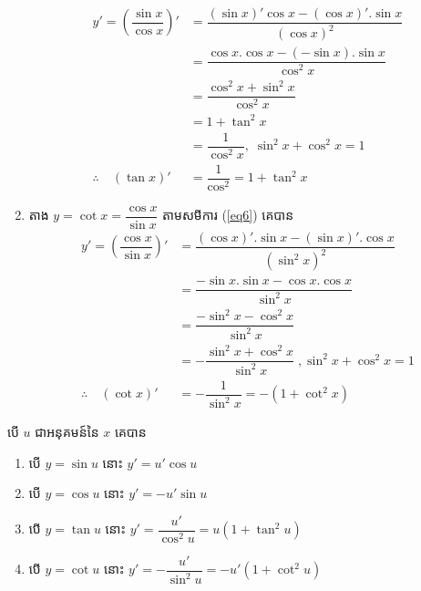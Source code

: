 \documentclass[a4paper,12pt]{article}
\begin{document}
\begin{enumerate}
	      \begin{align*}
		      y'=\left(\dfrac{\sin x}{\cos x} \right)' & =\dfrac{(\sin x)'\cos x-(\cos x)'.\sin x}{(\cos x)^2} \\
		                                               & =\dfrac{\cos x.\cos x-(-\sin x).\sin x}{\cos^2 x}     \\
		                                               & =\dfrac{\cos^2 x+\sin^2 x}{\cos^2 x}                  \\
		                                               & =1+\tan^2 x                                           \\
		                                               & =\dfrac{1}{\cos^2 x} ,\; \sin^2 x+\cos^2 x=1          \\
		      \therefore \quad (\tan x)'               & =\dfrac{1}{\cos^2}=1+\tan^2 x
	      \end{align*}
	\item តាង $y=\cot x=\dfrac{\cos x}{\sin x}$ តាមសមីការ (\ref{eq6}) គេបាន
	      \begin{align*}
		      y'=\left(\dfrac{\cos x}{\sin x} \right)' & =\dfrac{(\cos x)'.\sin x-(\sin x)'.\cos x}{(\sin^2x)^2}       \\
		                                               & =\dfrac{-\sin x. \sin x-\cos x.\cos x}{\sin^2 x}              \\
		                                               & =\dfrac{-\sin^2 x-\cos^2 x}{\sin^2 x}                         \\
		                                               & =-\dfrac{\sin^2 x+\cos^2 x}{\sin^2 x} \;, \sin^2 x+\cos^2 x=1 \\
		      \therefore \quad (\cot x)'               & =-\dfrac{1}{\sin^2 x}=-(1+\cot^2x)
	      \end{align*}
\end{enumerate}
\begin{general}
	បើ $u$ ជាអនុគមន៍នៃ $x$ គេបាន
	\begin{enumerate}
		\item បើ $y=\sin u$ នោះ $y'=u'\cos u$
		\item បើ $y=\cos u$ នោះ $y'=-u'\sin u$
		\item បើ $y=\tan u$ នោះ $y'=\dfrac{u'}{\cos^2 u}=u(1+\tan^2 u)$
		\item បើ $y=\cot u$ នោះ $y'=-\dfrac{u'}{\sin^2 u}=-u'(1+\cot^2 u)$
	\end{enumerate}

\end{general}
\end{document}
